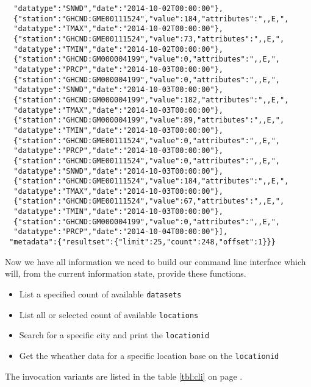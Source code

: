 \documentclass[10pt, a4paper]{article}
\begin{document}
\begin{verbatim}
  "datatype":"SNWD","date":"2014-10-02T00:00:00"},
  {"station":"GHCND:GME00111524","value":184,"attributes":",,E,",
  "datatype":"TMAX","date":"2014-10-02T00:00:00"},
  {"station":"GHCND:GME00111524","value":73,"attributes":",,E,",
  "datatype":"TMIN","date":"2014-10-02T00:00:00"},
  {"station":"GHCND:GM000004199","value":0,"attributes":",,E,",
  "datatype":"PRCP","date":"2014-10-03T00:00:00"},
  {"station":"GHCND:GM000004199","value":0,"attributes":",,E,",
  "datatype":"SNWD","date":"2014-10-03T00:00:00"},
  {"station":"GHCND:GM000004199","value":182,"attributes":",,E,",
  "datatype":"TMAX","date":"2014-10-03T00:00:00"},
  {"station":"GHCND:GM000004199","value":89,"attributes":",,E,",
  "datatype":"TMIN","date":"2014-10-03T00:00:00"},
  {"station":"GHCND:GME00111524","value":0,"attributes":",,E,",
  "datatype":"PRCP","date":"2014-10-03T00:00:00"},
  {"station":"GHCND:GME00111524","value":0,"attributes":",,E,",
  "datatype":"SNWD","date":"2014-10-03T00:00:00"},
  {"station":"GHCND:GME00111524","value":184,"attributes":",,E,",
  "datatype":"TMAX","date":"2014-10-03T00:00:00"},
  {"station":"GHCND:GME00111524","value":67,"attributes":",,E,",
  "datatype":"TMIN","date":"2014-10-03T00:00:00"},
  {"station":"GHCND:GM000004199","value":0,"attributes":",,E,",
  "datatype":"PRCP","date":"2014-10-04T00:00:00"}],
 "metadata":{"resultset":{"limit":25,"count":248,"offset":1}}}
\end{verbatim}

Now we have all information we need to build our command line interface which
will, from the current information state, provide these functions.

\begin{itemize}
  \item List a specified count of available \texttt{datasets}
  \item List all or selected count of available \texttt{locations}
  \item Search for a specific city and print the \texttt{locationid}
  \item Get the wheather data for a specific location base on the 
    \texttt{locationid}
\end{itemize}

The invocation variants are listed in the table \ref{tbl:cli} on page 
\pageref{tbl:cli}.
\end{document}
